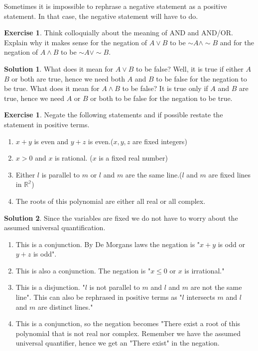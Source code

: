 \documentclass[a4paper, 11pt]{report}
\theoremstyle{plain}
\theoremstyle{definition}
\newtheorem{exrc}[thm]{Exercise}
\newtheorem*{sltn}{Solution}
\renewcommand{\neg}{{\sim}} %
\begin{document}
  Sometimes it is impossible to rephrase a negative statement as a positive
  statement. In that case, the negative statement will have to do.

  \begin{exrc}
    Think colloquially about the meaning of AND and AND/OR. Explain why it
    makes sense for the negation of $A \lor B$ to be $\neg A \land \neg B$ and
    for the negation of $A \land B$ to be $\neg A \lor \neg B$.
  \end{exrc}
  \begin{sltn}
    What does it mean for $A \lor B$ to be false? Well, it is true if either
    $A$  $B$ or both are true, hence we need both $A$ and $B$ to be false for
    the negation to be true.  What does it mean for $A \land B$ to be false? It
    is true only if $A$ and $B$ are true, hence we need $A$ or $B$ or both to
    be false for the negation to be true.
  \end{sltn}

  \begin{exrc}
    Negate the following statements and if possible restate the statement in positive terms.
    \begin{enumerate}
      \item $x + y$ is even and $y + z$ is even.($x, y, z$ are fixed integers)
      \item $x > 0$ and $x$ is rational. ($x$ is a fixed real number)
      \item Either $l$ is parallel to $m$ or $l$ and $m$ are the same line.($l$ and $m$ are fixed lines in $\mathbb{R^2}$)
      \item The roots of this polynomial are either all real or all complex. 
    \end{enumerate}
  \end{exrc}
  
  \begin{sltn}
    Since the variables are fixed we do not have to worry about the assumed
    universal quantification.
    \begin{enumerate}
      \item This is a conjunction. By De Morgans laws the negation is "$x + y$
        is odd or $y + z$ is odd".
      \item This is also a conjunction. The negation is "$x \leq 0$ or $x$ is
        irrational."
      \item This is a disjunction.  "$l$ is not parallel to $m$ and $l$ and $m$
        are not the same line". This can also be rephrased in positive terms as
        "$l$ intersects $m$ and $l$ and $m$ are distinct lines."
      \item This is a conjunction, so the negation becomes "There exist a root
        of this polynomial that is not real nor complex. Remember we have the
        assumed universal quantifier, hence we get an "There exist" in the
        negation.
    \end{enumerate}
  \end{sltn}
\end{document}
